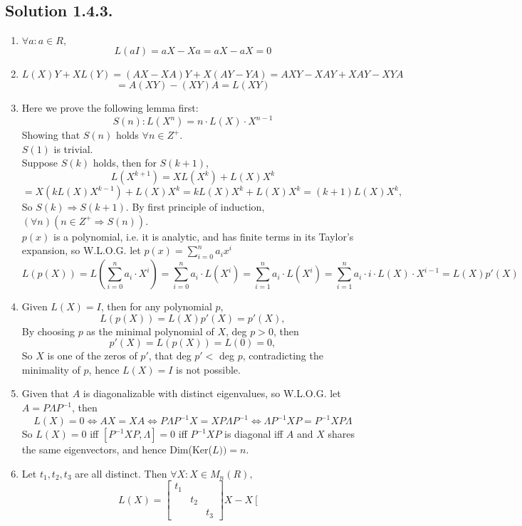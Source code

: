 \documentclass{article}
\begin{document}
\subsection*{Solution 1.4.3.}
\begin{enumerate}
    \item $\forall a:a\in R,$ 
    \[L(aI)=aX-Xa=aX-aX=0\]
    \item
    \[L(X)Y+XL(Y)=(AX-XA)Y+X(AY-YA)=AXY-XAY+XAY-XYA\]
    \[=A(XY)-(XY)A=L(XY)\]
    \item
    Here we prove the following lemma first:
    \[S(n): L(X^n)=n\cdot L(X)\cdot X^{n-1}\]
    Showing that $S(n)$ holds $\forall n\in Z^+$.\\
    $S(1)$ is trivial.\\
    Suppose $S(k)$ holds, then for $S(k+1)$,\\
    \[L(X^{k+1})=XL(X^k)+L(X)X^k\]
    \[=X(kL(X)X^{k-1})+L(X)X^k=kL(X)X^k+L(X)X^k=(k+1)L(X)X^k,\]
    So $S(k)\Rightarrow S(k+1)$. By first principle of induction, $(\forall n)(n\in Z^+\Rightarrow S(n))$.\\
    $p(x)$ is a polynomial, i.e. it is analytic, and has finite terms in its Taylor's expansion, so W.L.O.G. let 
    $p(x)=\sum_{i=0}^n a_ix^i$
    \[L(p(X))=L(\sum_{i=0}^n a_i\cdot X^i)=\sum_{i=0}^n a_i\cdot L(X^i)=\sum_{i=1}^n a_i\cdot L(X^i)=\sum_{i=1}^n a_i\cdot i\cdot L(X) \cdot X^{i-1} = L(X) p'(X)\]
    \item Given $L(X)=I$, then for any polynomial $p$,
    \[L(p(X))=L(X)p'(X)=p'(X),\]
    By choosing $p$ as the minimal polynomial of $X$, deg $p>0$, then
    \[p'(X)=L(p(X))=L(0)=0,\]
    So $X$ is one of the zeros of  $p'$, that deg $p'<$ deg $p$, contradicting the minimality of $p$, hence $L(X)=I$ is not possible.  
    \item Given that $A$ is diagonalizable with distinct eigenvalues, so W.L.O.G. let $A=P\Lambda P^{-1}$, then
    \[ L(X)=0 \Leftrightarrow AX=XA \Leftrightarrow P\Lambda P^{-1}X = X P\Lambda P^{-1}\Leftrightarrow \Lambda P^{-1} XP=P^{-1}XP\Lambda\]
    So $L(X)=0$ iff $[P^{-1}XP,\Lambda]=0$ iff $P^{-1}XP$ is diagonal iff $A$ and $X$ shares the same eigenvectors, and hence Dim(Ker($L))=n$.
    \item Let $t_1,t_2,t_3$ are all distinct. Then $\forall X:X\in M_n(R),$
    \[L(X)=\left[\begin{array}{ccc}
    t_1\\&t_2\\&&t_3
    \end{array}\right]X
    -X\left[\begin{array}{ccc}

\end{array}\]
\end{enumerate}
\end{document}
